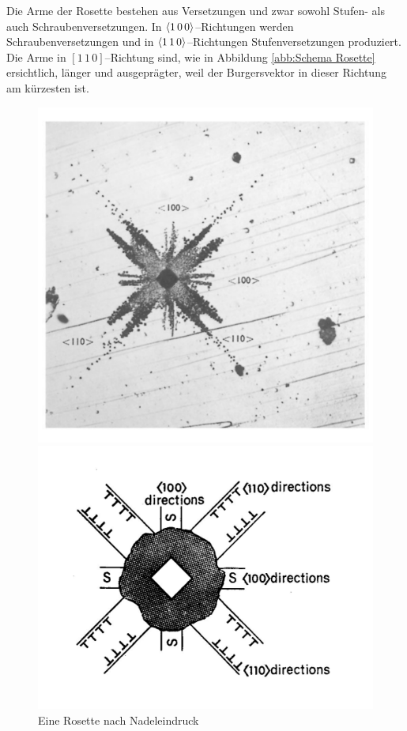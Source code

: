 \documentclass[12pt,a4paper]{scrartcl}
\numberwithin{equation}{section} %
\begin{document}
Die Arme der Rosette bestehen aus Versetzungen und zwar sowohl Stufen- als auch Schraubenversetzungen. In $\expval{1\,0\,0}$--Richtungen werden Schraubenversetzungen und in $\expval{1\,1\,0}$--Richtungen Stufenversetzungen produziert. Die Arme in $[1\,1\,0]$--Richtung sind, wie in Abbildung \ref{abb:Schema Rosette} ersichtlich, länger und ausgeprägter, weil der Burgersvektor in dieser Richtung am kürzesten ist.

\begin{figure}[ht]
	\begin{minipage}[t]{.3\linewidth}
		\includegraphics[width=\textwidth]{../media/B2.8/Nadeleindruck.pdf}
		\caption{Eine Rosette nach Nadeleindruck \cite[S. 18]{Newey}}
		\label{abb:Rosette}
	\end{minipage}
	\begin{minipage}[t]{.3\linewidth}
		\includegraphics[width=\textwidth]{../media/B2.8/Rosette_Schema.pdf}

\end{minipage}
\end{figure}
\end{document}

